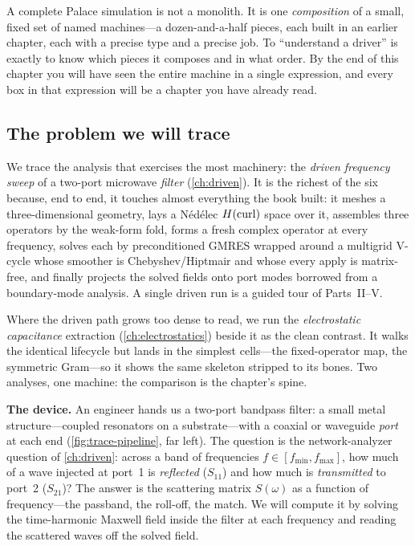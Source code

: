 \begin{keyidea}
A complete Palace simulation is not a monolith. It is one \emph{composition} of a
small, fixed set of named machines---a dozen-and-a-half pieces, each built in an
earlier chapter, each with a precise type and a precise job. To ``understand a
driver'' is exactly to know which pieces it composes and in what order. By the end
of this chapter you will have seen the entire machine in a single expression, and
every box in that expression will be a chapter you have already read.
\end{keyidea}

\subsection{The problem we will trace}

We trace the analysis that exercises the most machinery: the \emph{driven
frequency sweep} of a two-port microwave \emph{filter} (\cref{ch:driven}). It is
the richest of the six because, end to end, it touches almost everything the book
built: it meshes a three-dimensional geometry, lays a Nédélec $H(\mathrm{curl})$ space over
it, assembles three operators by the weak-form fold, forms a fresh complex
operator at every frequency, solves each by preconditioned GMRES wrapped around a
multigrid V-cycle whose smoother is Chebyshev/Hiptmair and whose every apply is
matrix-free, and finally projects the solved fields onto port modes borrowed from
a boundary-mode analysis. A single driven run is a guided tour of Parts~II--V.

Where the driven path grows too dense to read, we run the \emph{electrostatic
capacitance} extraction (\cref{ch:electrostatics}) beside it as the clean
contrast. It walks the identical lifecycle but lands in the simplest cells---the
fixed-operator map, the symmetric Gram---so it shows the same skeleton stripped to
its bones. Two analyses, one machine: the comparison is the chapter's spine.

\begin{physicsbox}
\textbf{The device.} An engineer hands us a two-port bandpass filter: a small
metal structure---coupled resonators on a substrate---with a coaxial or
waveguide \emph{port} at each end (\cref{fig:trace-pipeline}, far left). The
question is the network-analyzer question of \cref{ch:driven}: across a band of
frequencies $f \in [f_{\min}, f_{\max}]$, how much of a wave injected at port~1
is \emph{reflected} ($S_{11}$) and how much is \emph{transmitted} to port~2
($S_{21}$)? The answer is the scattering matrix $S(\omega)$ as a function of
frequency---the passband, the roll-off, the match. We will compute it by solving
the time-harmonic Maxwell field inside the filter at each frequency and reading
the scattered waves off the solved field.
\end{physicsbox}

